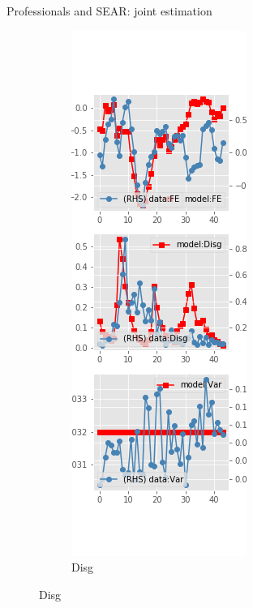 \documentclass{beamer}
\begin{document}
\begin{frame}{Professionals and SEAR: joint estimation}
\begin{figure}[ht]
\begin{subfigure}[b]{0.2\textwidth}
		\end{subfigure}
		\hfill
		\begin{subfigure}[b]{0.2\textwidth}
			\caption{Disg}
			\includegraphics[width=\textwidth, height = 0.8\textheight]{figuresDraft/spf_se_est_joint_diag1.png}

\end{subfigure}
\end{figure}
\end{frame}
\end{document}
